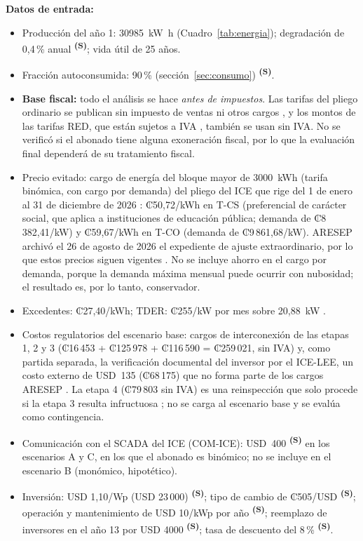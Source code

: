 \documentclass[12pt]{article}
\newcommand{\supuesto}{\textsuperscript{\textcolor{orange!80!black}{\textbf{(S)}}}}
\begin{document}
\textbf{Datos de entrada:}
\begin{itemize}
\item Producción del año 1: \SI{30985}{\kilo\watt\hour} (Cuadro~\ref{tab:energia}); degradación de 0,4\,\% anual \supuesto{}; vida útil de 25 años.
\item Fracción autoconsumida: 90\,\% (sección~\ref{sec:consumo}) \supuesto{}.
\item \textbf{Base fiscal:} todo el análisis se hace \emph{antes de impuestos}. Las tarifas del pliego ordinario se publican sin impuesto de ventas ni otros cargos \cite{icePliego}, y los montos de las tarifas RED, que están sujetos a IVA \cite{iceTarRED}, también se usan sin IVA. No se verificó si el abonado tiene alguna exoneración fiscal, por lo que la evaluación final dependerá de su tratamiento fiscal.
\item Precio evitado: cargo de energía del bloque mayor de 3000~kWh (tarifa binómica, con cargo por demanda) del pliego del ICE que rige del 1 de enero al 31 de diciembre de 2026 \cite{icePliego}: ₡50,72/kWh en T-CS (preferencial de carácter social, que aplica a instituciones de educación pública; demanda de ₡8\,382,41/kW) y ₡59,67/kWh en T-CO (demanda de ₡9\,861,68/kW). ARESEP archivó el 26 de agosto de 2026 el expediente de ajuste extraordinario, por lo que estos precios siguen vigentes \cite{aresepArchivo}. No se incluye ahorro en el cargo por demanda, porque la demanda máxima mensual puede ocurrir con nubosidad; el resultado es, por lo tanto, conservador.
\item Excedentes: ₡27,40/kWh; TDER: ₡255/kW por mes sobre 20,88~kW \cite{iceTarRED}.
\item Costos regulatorios del escenario base: cargos de interconexión de las etapas 1, 2 y 3 (₡16\,453 + ₡125\,978 + ₡116\,590 = ₡259\,021, sin IVA) \cite{iceTarRED} y, como partida separada, la verificación documental del inversor por el ICE-LEE, un costo externo de USD~135 (₡68\,175) que no forma parte de los cargos ARESEP \cite{iceGuia}. La etapa 4 (₡79\,803 sin IVA) es una reinspección que solo procede si la etapa 3 resulta infructuosa \cite{iceGuia,aresepMetod}; no se carga al escenario base y se evalúa como contingencia.
\item Comunicación con el SCADA del ICE (COM-ICE): USD~400 \supuesto{} en los escenarios A y C, en los que el abonado es binómico; no se incluye en el escenario B (monómico, hipotético).
\item Inversión: USD 1,10/Wp (USD 23\,000) \supuesto{}; tipo de cambio de ₡505/USD \supuesto{}; operación y mantenimiento de USD 10/kWp por año \supuesto{}; reemplazo de inversores en el año 13 por USD 4000 \supuesto{}; tasa de descuento del 8\,\% \supuesto{}.
\end{itemize}
\end{document}

